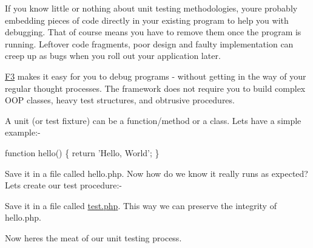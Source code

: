 If you know little or nothing about unit testing methodologies, you\textquotesingle{}re probably embedding pieces of code directly in your existing program to help you with debugging. That of course means you have to remove them once the program is running. Leftover code fragments, poor design and faulty implementation can creep up as bugs when you roll out your application later.

\hyperlink{class_f3}{F3} makes it easy for you to debug programs -\/ without getting in the way of your regular thought processes. The framework does not require you to build complex O\+OP classes, heavy test structures, and obtrusive procedures.

A unit (or test fixture) can be a function/method or a class. Let\textquotesingle{}s have a simple example\+:-\/


\begin{DoxyCode}
function hello() \{
    return 'Hello, World';
\}
\end{DoxyCode}


Save it in a file called {\ttfamily hello.\+php}. Now how do we know it really runs as expected? Let\textquotesingle{}s create our test procedure\+:-\/




Save it in a file called {\ttfamily \hyperlink{test_8php_source}{test.\+php}}. This way we can preserve the integrity of {\ttfamily hello.\+php}.

Now here\textquotesingle{}s the meat of our unit testing process.

